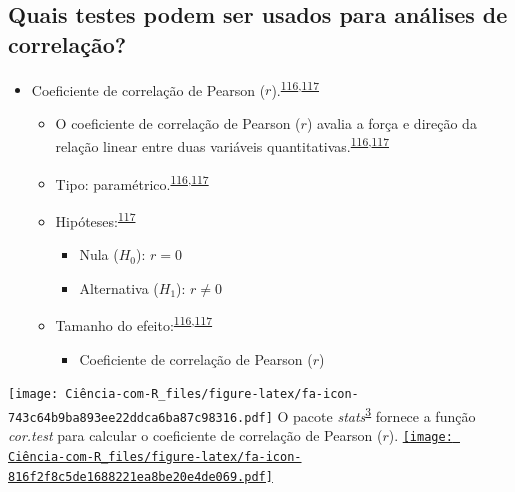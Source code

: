 \documentclass[
]{book}
\providecommand{\tightlist}{%
  \setlength{\itemsep}{0pt}\setlength{\parskip}{0pt}}
\begin{document}
\hypertarget{quais-testes-podem-ser-usados-para-anuxe1lises-de-correlauxe7uxe3o}{%
\subsection{Quais testes podem ser usados para análises de correlação?}\label{quais-testes-podem-ser-usados-para-anuxe1lises-de-correlauxe7uxe3o}}

\begin{itemize}
\item
  Coeficiente de correlação de Pearson (\(r\)).\textsuperscript{\protect\hyperlink{ref-khamis2008}{116},\protect\hyperlink{ref-allison2022}{117}}

  \begin{itemize}
  \item
    O coeficiente de correlação de Pearson (\(r\)) avalia a força e direção da relação linear entre duas variáveis quantitativas.\textsuperscript{\protect\hyperlink{ref-khamis2008}{116},\protect\hyperlink{ref-allison2022}{117}}
  \item
    Tipo: paramétrico.\textsuperscript{\protect\hyperlink{ref-khamis2008}{116},\protect\hyperlink{ref-allison2022}{117}}
  \item
    Hipóteses:\textsuperscript{\protect\hyperlink{ref-allison2022}{117}}

    \begin{itemize}
    \item
      Nula (\(H_{0}\)): \(r=0\)
    \item
      Alternativa (\(H_{1}\)): \(r≠0\)
    \end{itemize}
  \item
    Tamanho do efeito:\textsuperscript{\protect\hyperlink{ref-khamis2008}{116},\protect\hyperlink{ref-allison2022}{117}}

    \begin{itemize}
    \tightlist
    \item
      Coeficiente de correlação de Pearson (\(r\))
    \end{itemize}
  \end{itemize}
\end{itemize}

\texttt{[image: Ciência-com-R\_files/figure-latex/fa-icon-743c64b9ba893ee22ddca6ba87c98316.pdf]} O pacote \emph{stats}\textsuperscript{\protect\hyperlink{ref-stats-2}{3}} fornece a função \emph{cor.test} para calcular o coeficiente de correlação de Pearson (\(r\)). \href{https://rdocumentation.org/packages/stats/versions/3.6.2}{\texttt{[image: Ciência-com-R\_files/figure-latex/fa-icon-816f2f8c5de1688221ea8be20e4de069.pdf]}}
\end{document}
